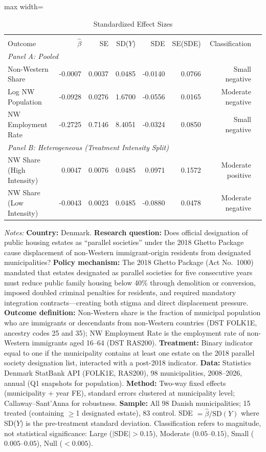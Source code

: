 \begin{table}[htbp]
\centering
\caption{Standardized Effect Sizes}
\label{tab:sde}
\small
\begin{adjustbox}{max width=\textwidth}
\begin{tabular}{lrrrrrrr}
\hline\hline
 & & & & & & \\[-1ex]
Outcome & $\hat{\beta}$ & SE & SD($Y$) & SDE & SE(SDE) & Classification \\
\hline
\multicolumn{7}{l}{\textit{Panel A: Pooled}} \\[0.5ex]
Non-Western Share & -0.0007 & 0.0037 & 0.0485 & -0.0140 & 0.0766 & Small negative \\
Log NW Population & -0.0928 & 0.0276 & 1.6700 & -0.0556 & 0.0165 & Moderate negative \\
NW Employment Rate & -0.2725 & 0.7146 & 8.4051 & -0.0324 & 0.0850 & Small negative \\
[0.5ex]
\multicolumn{7}{l}{\textit{Panel B: Heterogeneous (Treatment Intensity Split)}} \\[0.5ex]
NW Share (High Intensity) & 0.0047 & 0.0076 & 0.0485 & 0.0971 & 0.1572 & Moderate positive \\
NW Share (Low Intensity) & -0.0043 & 0.0023 & 0.0485 & -0.0880 & 0.0478 & Moderate negative \\
\hline\hline
\end{tabular}
\end{adjustbox}
\begin{tablenotes}[flushleft]
\small
\item \textit{Notes:} \textbf{Country:} Denmark. \textbf{Research question:} Does official designation of public housing estates as ``parallel societies'' under the 2018 Ghetto Package cause displacement of non-Western immigrant-origin residents from designated municipalities? \textbf{Policy mechanism:} The 2018 Ghetto Package (Act No.~1000) mandated that estates designated as parallel societies for five consecutive years must reduce public family housing below 40\% through demolition or conversion, imposed doubled criminal penalties for residents, and required mandatory integration contracts---creating both stigma and direct displacement pressure. \textbf{Outcome definition:} Non-Western share is the fraction of municipal population who are immigrants or descendants from non-Western countries (DST FOLK1E, ancestry codes 25 and 35); NW Employment Rate is the employment rate of non-Western immigrants aged 16--64 (DST RAS200). \textbf{Treatment:} Binary indicator equal to one if the municipality contains at least one estate on the 2018 parallel society designation list, interacted with a post-2018 indicator. \textbf{Data:} Statistics Denmark StatBank API (FOLK1E, RAS200), 98 municipalities, 2008--2026, annual (Q1 snapshots for population). \textbf{Method:} Two-way fixed effects (municipality + year FE), standard errors clustered at municipality level; Callaway--Sant'Anna for robustness. \textbf{Sample:} All 98 Danish municipalities; 15 treated (containing $\geq$1 designated estate), 83 control. SDE $= \hat{\beta} / \text{SD}(Y)$ where SD($Y$) is the pre-treatment standard deviation. Classification refers to magnitude, not statistical significance: Large ($|$SDE$| > 0.15$), Moderate ($0.05$--$0.15$), Small ($0.005$--$0.05$), Null ($< 0.005$).

\end{tablenotes}
\end{table}
